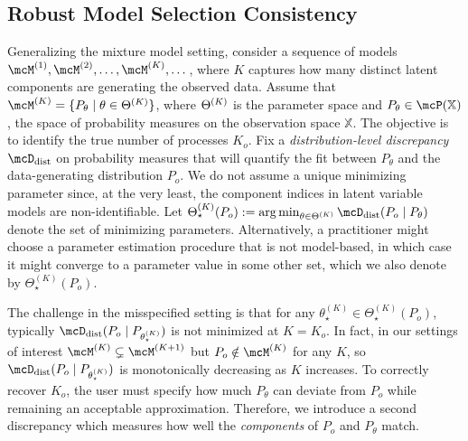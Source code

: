\subsection{Robust Model Selection Consistency} \label{sec:robust-consistency}

Generalizing the mixture model setting, consider a sequence of models $\model{1}, \model{2}, \dots, \model{K}, \dots$, where $K$ captures how many distinct latent components are generating the observed data.
Assume that $\model{K} = \{ P_{\theta} \mid \theta \in \paramSpace{K} \}$, where $\Theta^{(K)}$ is the parameter space
and $P_{\theta} \in \mcP(\mathbb{X})$, the space of probability measures on the observation space $\mathbb{X}$. 
The objective is to identify the true number of processes $K_o$.
Fix a \emph{distribution-level discrepancy} $\distDisc$ on probability measures that will quantify the fit between $P_{\theta}$ and the data-generating distribution $P_{o}$.
We do not assume a unique minimizing parameter since, at the very least, 
the component indices in latent variable models are non-identifiable. 
Let $\Theta_{\star}^{(K)}(P_{o}) \defas \argmin_{\theta \in\paramSpace{K}} \distDisc(P_{o} \mid P_{\theta})$ 
denote the set of minimizing parameters.
Alternatively, a practitioner might choose a parameter estimation procedure that is not model-based, in which case it might converge to a parameter value in some other set, which we also denote by $\Theta_{\star}^{(K)}(P_{o})$.

The challenge in the misspecified setting is that for any $\theta_{\star}^{(K)} \in \Theta_{\star}^{(K)}(P_{o})$, typically $\distDisc(P_{o} \mid P_{\theta_{\star}^{(K)}})$ is not minimized at $K = K_{o}$.
In fact, in our settings of interest $\model{K} \subsetneq \model{K+1}$ but $P_{o} \notin \model{K}$ for any $K$, so
$\distDisc(P_{o} \mid P_{\theta_{\star}^{(K)}})$ is monotonically decreasing as $K$ increases. 
To correctly recover $K_{o}$, the user must specify how much $P_{\theta}$ can deviate from $P_{o}$ while remaining an acceptable approximation.
Therefore, we introduce a second discrepancy which measures how well the \emph{components} of $P_{o}$ and $P_{\theta}$ match.

